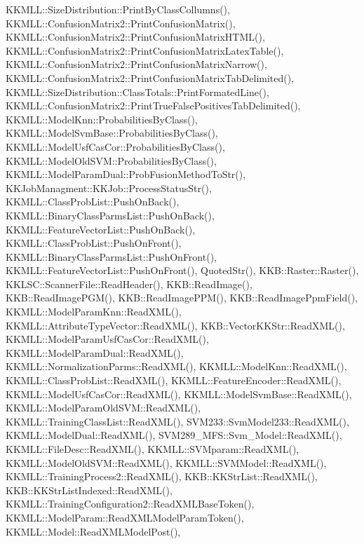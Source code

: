 K\+K\+M\+L\+L\+::\+Size\+Distribution\+::\+Print\+By\+Class\+Collumns(), K\+K\+M\+L\+L\+::\+Confusion\+Matrix2\+::\+Print\+Confusion\+Matrix(), K\+K\+M\+L\+L\+::\+Confusion\+Matrix2\+::\+Print\+Confusion\+Matrix\+H\+T\+M\+L(), K\+K\+M\+L\+L\+::\+Confusion\+Matrix2\+::\+Print\+Confusion\+Matrix\+Latex\+Table(), K\+K\+M\+L\+L\+::\+Confusion\+Matrix2\+::\+Print\+Confusion\+Matrix\+Narrow(), K\+K\+M\+L\+L\+::\+Confusion\+Matrix2\+::\+Print\+Confusion\+Matrix\+Tab\+Delimited(), K\+K\+M\+L\+L\+::\+Size\+Distribution\+::\+Class\+Totals\+::\+Print\+Formated\+Line(), K\+K\+M\+L\+L\+::\+Confusion\+Matrix2\+::\+Print\+True\+False\+Positives\+Tab\+Delimited(), K\+K\+M\+L\+L\+::\+Model\+Knn\+::\+Probabilities\+By\+Class(), K\+K\+M\+L\+L\+::\+Model\+Svm\+Base\+::\+Probabilities\+By\+Class(), K\+K\+M\+L\+L\+::\+Model\+Usf\+Cas\+Cor\+::\+Probabilities\+By\+Class(), K\+K\+M\+L\+L\+::\+Model\+Old\+S\+V\+M\+::\+Probabilities\+By\+Class(), K\+K\+M\+L\+L\+::\+Model\+Param\+Dual\+::\+Prob\+Fusion\+Method\+To\+Str(), K\+K\+Job\+Managment\+::\+K\+K\+Job\+::\+Process\+Status\+Str(), K\+K\+M\+L\+L\+::\+Class\+Prob\+List\+::\+Push\+On\+Back(), K\+K\+M\+L\+L\+::\+Binary\+Class\+Parms\+List\+::\+Push\+On\+Back(), K\+K\+M\+L\+L\+::\+Feature\+Vector\+List\+::\+Push\+On\+Back(), K\+K\+M\+L\+L\+::\+Class\+Prob\+List\+::\+Push\+On\+Front(), K\+K\+M\+L\+L\+::\+Binary\+Class\+Parms\+List\+::\+Push\+On\+Front(), K\+K\+M\+L\+L\+::\+Feature\+Vector\+List\+::\+Push\+On\+Front(), Quoted\+Str(), K\+K\+B\+::\+Raster\+::\+Raster(), K\+K\+L\+S\+C\+::\+Scanner\+File\+::\+Read\+Header(), K\+K\+B\+::\+Read\+Image(), K\+K\+B\+::\+Read\+Image\+P\+G\+M(), K\+K\+B\+::\+Read\+Image\+P\+P\+M(), K\+K\+B\+::\+Read\+Image\+Ppm\+Field(), K\+K\+M\+L\+L\+::\+Model\+Param\+Knn\+::\+Read\+X\+M\+L(), K\+K\+M\+L\+L\+::\+Attribute\+Type\+Vector\+::\+Read\+X\+M\+L(), K\+K\+B\+::\+Vector\+K\+K\+Str\+::\+Read\+X\+M\+L(), K\+K\+M\+L\+L\+::\+Model\+Param\+Usf\+Cas\+Cor\+::\+Read\+X\+M\+L(), K\+K\+M\+L\+L\+::\+Model\+Param\+Dual\+::\+Read\+X\+M\+L(), K\+K\+M\+L\+L\+::\+Normalization\+Parms\+::\+Read\+X\+M\+L(), K\+K\+M\+L\+L\+::\+Model\+Knn\+::\+Read\+X\+M\+L(), K\+K\+M\+L\+L\+::\+Class\+Prob\+List\+::\+Read\+X\+M\+L(), K\+K\+M\+L\+L\+::\+Feature\+Encoder\+::\+Read\+X\+M\+L(), K\+K\+M\+L\+L\+::\+Model\+Usf\+Cas\+Cor\+::\+Read\+X\+M\+L(), K\+K\+M\+L\+L\+::\+Model\+Svm\+Base\+::\+Read\+X\+M\+L(), K\+K\+M\+L\+L\+::\+Model\+Param\+Old\+S\+V\+M\+::\+Read\+X\+M\+L(), K\+K\+M\+L\+L\+::\+Training\+Class\+List\+::\+Read\+X\+M\+L(), S\+V\+M233\+::\+Svm\+Model233\+::\+Read\+X\+M\+L(), K\+K\+M\+L\+L\+::\+Model\+Dual\+::\+Read\+X\+M\+L(), S\+V\+M289\+\_\+\+M\+F\+S\+::\+Svm\+\_\+\+Model\+::\+Read\+X\+M\+L(), K\+K\+M\+L\+L\+::\+File\+Desc\+::\+Read\+X\+M\+L(), K\+K\+M\+L\+L\+::\+S\+V\+Mparam\+::\+Read\+X\+M\+L(), K\+K\+M\+L\+L\+::\+Model\+Old\+S\+V\+M\+::\+Read\+X\+M\+L(), K\+K\+M\+L\+L\+::\+S\+V\+M\+Model\+::\+Read\+X\+M\+L(), K\+K\+M\+L\+L\+::\+Training\+Process2\+::\+Read\+X\+M\+L(), K\+K\+B\+::\+K\+K\+Str\+List\+::\+Read\+X\+M\+L(), K\+K\+B\+::\+K\+K\+Str\+List\+Indexed\+::\+Read\+X\+M\+L(), K\+K\+M\+L\+L\+::\+Training\+Configuration2\+::\+Read\+X\+M\+L\+Base\+Token(), K\+K\+M\+L\+L\+::\+Model\+Param\+::\+Read\+X\+M\+L\+Model\+Param\+Token(), K\+K\+M\+L\+L\+::\+Model\+::\+Read\+X\+M\+L\+Model\+Post(), 